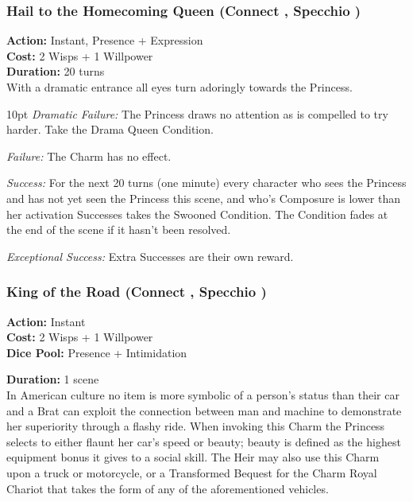 \subsubsection*{Hail to the Homecoming Queen (Connect \textbullet\textbullet, Specchio \textbullet\textbullet\textbullet)}

\noindent \textbf{Action:} Instant, Presence + Expression \\

\noindent \textbf{Cost:} 2 Wisps + 1 Willpower \\ 

\noindent \textbf{Duration:} 20 turns  \\

\noindent With a dramatic entrance all eyes turn adoringly towards the Princess. 

\begin{myindentpar}{10pt} \emph{Dramatic Failure:} The Princess draws no attention as is compelled to try harder. Take the Drama Queen Condition. 
   
    \emph{Failure:} The Charm has no effect.
	
    \emph{Success:} For the next 20 turns (one minute) every character who sees the Princess and has not yet seen the Princess this scene, and who's Composure is lower than her activation Successes takes the Swooned Condition. The Condition fades at the end of the scene if it hasn't been resolved. 
	
    \emph{Exceptional Success:} Extra Successes are their own reward.\end{myindentpar}
	
\subsubsection*{King of the Road (Connect \textbullet\textbullet, Specchio \textbullet\textbullet\textbullet)}

\noindent \textbf{Action:} Instant\\

\noindent \textbf{Cost:} 2 Wisps + 1 Willpower \\ 

\noindent \textbf{Dice Pool:} Presence + Intimidation

\noindent \textbf{Duration:} 1 scene  \\

\noindent In American culture no item is more symbolic of a person's status than their car and a Brat can exploit the connection between man and machine to demonstrate her superiority through a flashy ride. When invoking this Charm the Princess selects to either flaunt her car's speed or beauty; beauty is defined as the highest equipment bonus it gives to a social skill. The Heir may also use this Charm upon a truck or motorcycle, or a Transformed Bequest for the Charm Royal Chariot that takes the form of any of the aforementioned vehicles.


